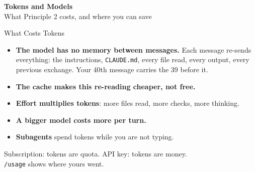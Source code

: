 \documentclass[svgnames,x11names,dvipsnames]{beamer}
\newcommand{\chg}[1]{{\bfseries #1}}
\renewcommand{\chg}[1]{#1}
\begin{document}

\begin{frame}[plain]
  \centering
  \vfill
  {\LARGE \textbf{\textcolor{titleblue}{Tokens and Models}}}\\[0.4cm]
  {What Principle 2 costs, and where you can save}
  \vfill
\end{frame}

\begin{frame}{What Costs Tokens}

\begin{itemize}
    \setlength{\itemsep}{8pt}
    \item \textbf{\chg{The model has no memory between messages.}} \chg{Each message re-sends everything: the instructions, \texttt{CLAUDE.md}, every file read, every output, every previous exchange. Your 40th message carries the 39 before it.}
    \item \textbf{\chg{The cache makes this re-reading cheaper, not free.}}
    \item \textbf{Effort multiplies tokens}: more files read, more checks, more thinking.
    \item \textbf{A bigger model costs more per turn.}
    \item \textbf{Subagents} spend tokens while you are not typing.
\end{itemize}

\vspace{0.4cm}

\centering
Subscription: tokens are quota. API key: tokens are money.\\
\texttt{/usage} shows where yours went.

\end{frame}
\end{document}
